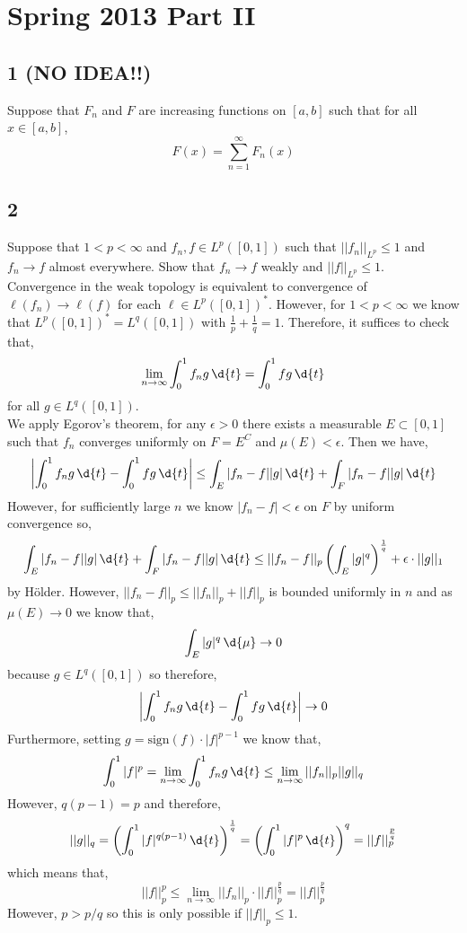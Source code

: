 \documentclass[12pt]{article}
\begin{document}
\section{Spring 2013 Part II}

\subsection{1 (NO IDEA!!)}

Suppose that $F_n$ and $F$ are increasing functions on $[a,b]$ such that for all $x \in [a,b]$,
\[ F(x) = \sum_{n = 1}^\infty F_n(x) \]

\subsection{2}

Suppose that $1 < p < \infty$ and $f_n, f \in L^p([0,1])$ such that $||f_n ||_{L^p} \le 1$ and $f_n \to f$ almost everywhere. Show that $f_n \to f$ weakly and $|| f ||_{L^p} \le 1$.
\bigskip\\
Convergence in the weak topology is equivalent to convergence of $\ell(f_n) \to \ell(f)$ for each $\ell \in L^p([0,1])^*$. However, for $1 < p < \infty$ we know that $L^p([0, 1])^* = L^q([0, 1])$ with $\frac{1}{p} + \frac{1}{q} = 1$. Therefore, it suffices to check that,
\[ \lim_{n \to \infty} \int_0^1 f_n g \, \d{t} = \int_0^1 fg \, \d{t} \]
for all $g \in L^q([0, 1])$.
\bigskip\\
We apply Egorov's theorem, for any $\epsilon > 0$ there exists a measurable $E \subset [0,1]$ such that $f_n$ converges uniformly on $F = E^C$ and $\mu(E) < \epsilon$. Then we have,
\begin{align*}
\left| \int_0^1 f_n g \, \d{t} - \int_0^1 fg \, \d{t} \right| \le \int_E |f_n - f| |g| \, \d{t} + \int_F |f_n - f| |g| \, \d{t} 
\end{align*}
However, for sufficiently large $n$ we know $|f_n - f| < \epsilon$ on $F$ by uniform convergence so,
\[ \int_E |f_n - f| |g| \, \d{t} + \int_F |f_n - f| |g| \, \d{t} \le || f_n - f ||_p \left( \int_E | g |^q \right)^{\frac{1}{q}} +  \epsilon \cdot || g ||_1 \]
by H\"{o}lder. However, $||f_n - f ||_p \le || f_n ||_p + || f ||_p$ is bounded uniformly in $n$ and as $\mu(E) \to 0$ we know that,
\[ \int_E | g |^q \, \d{\mu} \to 0 \]
because $g \in L^q([0,1])$ so therefore,
\[ \left| \int_0^1 f_n g \, \d{t} - \int_0^1 fg \, \d{t} \right| \to 0 \]
Furthermore, setting $g = \mathrm{sign}(f) \cdot |f|^{p - 1}$ we know that,
\[ \int_0^1 |f|^p = \lim_{n \to \infty} \int_0^1 f_n g \, \d{t} \le \lim_{n \to \infty} || f_n ||_{p} || g ||_q \]
However, $q(p-1) = p$ and therefore,
\[ || g ||_q = \left( \int_0^1 |f|^{q(p-1)} \, \d{t} \right)^{\frac{1}{q}} = \left( \int_0^1 |f|^p \, \d{t} \right)^{q} = || f ||_p^{\frac{p}{q}} \]
which means that,
\[ || f ||_p^p \le \lim_{n \to \infty} || f_n ||_p \cdot || f ||_p^{\frac{p}{q}} = || f ||_p^{\frac{p}{q}} \]
However, $p > p/q$ so this is only possible if $|| f ||_p \le 1$.
\end{document}
